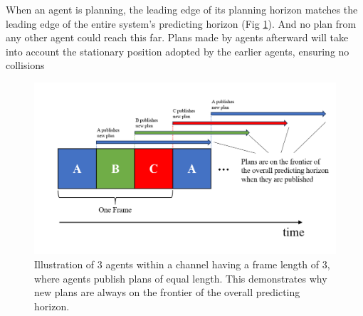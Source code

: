     When an agent is planning, the leading edge of its planning horizon matches the leading edge of the entire system's predicting horizon (Fig \ref{fig:RecedingHorizon}). And no plan from any other agent could reach this far. Plans made by agents afterward will take into account the stationary position adopted by the earlier agents, ensuring no collisions


\begin{figure}[htbp]
    \centering
    \includegraphics[width = \linewidth]{figures/RecedingHorizon.png}
    \caption{Illustration of 3 agents within a channel having a frame length of 3, where agents publish plans of equal length. This demonstrates why new plans are always on the frontier of the overall predicting horizon.}
    \label{fig:RecedingHorizon}
\end{figure}

